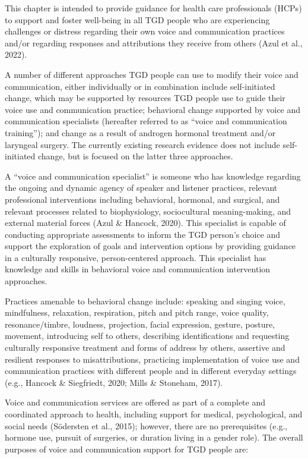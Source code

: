 \documentclass[
]{book}
\begin{document}
This chapter is intended to provide guidance
for health care professionals (HCPs) to support
and foster well-being in all TGD people who are
experiencing challenges or distress regarding their
own voice and communication practices and/or
regarding responses and attributions they receive
from others (Azul et al., 2022).

A number of different approaches TGD people
can use to modify their voice and communication, either individually or in combination include
self-initiated change, which may be supported by
resources TGD people use to guide their voice
use and communication practice; behavioral
change supported by voice and communication
specialists (hereafter referred to as ``voice and
communication training''); and change as a result
of androgen hormonal treatment and/or laryngeal
surgery. The currently existing research evidence
does not include self-initiated change, but is
focused on the latter three approaches.

A ``voice and communication specialist'' is
someone who has knowledge regarding the ongoing and dynamic agency of speaker and listener
practices, relevant professional interventions
including behavioral, hormonal, and surgical, and
relevant processes related to biophysiology, sociocultural meaning-making, and external material
forces (Azul \& Hancock, 2020). This specialist is
capable of conducting appropriate assessments to
inform the TGD person's choice and support the
exploration of goals and intervention options by
providing guidance in a culturally responsive,
person-centered approach. This specialist has
knowledge and skills in behavioral voice and
communication intervention approaches.

Practices amenable to behavioral change
include: speaking and singing voice, mindfulness,
relaxation, respiration, pitch and pitch range,
voice quality, resonance/timbre, loudness, projection, facial expression, gesture, posture, movement, introducing self to others, describing
identifications and requesting culturally responsive treatment and forms of address by others,
assertive and resilient responses to misattributions, practicing implementation of voice use and
communication practices with different people
and in different everyday settings (e.g., Hancock
\& Siegfriedt, 2020; Mills \& Stoneham, 2017).

Voice and communication services are offered
as part of a complete and coordinated approach
to health, including support for medical, psychological, and social needs (Södersten et al., 2015);
however, there are no prerequisites (e.g., hormone
use, pursuit of surgeries, or duration living in a
gender role). The overall purposes of voice and
communication support for TGD people are:
\end{document}
